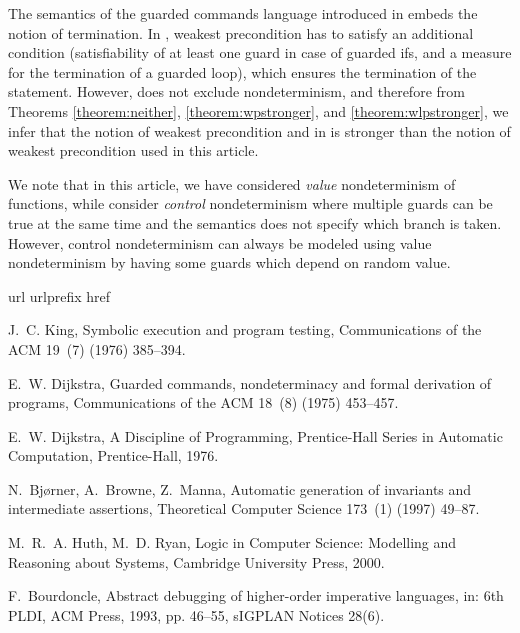 \documentclass[times]{elsarticle}
\begin{document}
The semantics of the guarded commands language introduced in
\cite{dijkstra75gcl} embeds the notion of termination. In
\cite{dijkstra75gcl}, weakest precondition has to satisfy an
additional condition  (satisfiability of at least one guard in case
of guarded ifs, and a measure for the termination of a guarded loop),
which ensures the termination of the statement. However,  does not
exclude nondeterminism, and therefore from Theorems
\ref{theorem:neither}, \ref{theorem:wpstronger}, and
\ref{theorem:wlpstronger}, we infer that the notion of weakest
precondition and  in \cite{dijkstra76lang} is stronger than the
notion of weakest precondition used in this article.

We note that in this article, we have considered \emph{value\/}
nondeterminism of functions, while \cite{dijkstra75gcl} consider
\emph{control\/} nondeterminism where multiple guards can be true at
the same time and the semantics does not specify which branch is
taken. However, control nondeterminism can always be modeled using
value nondeterminism by having some guards which depend on random
value.

\begin{thebibliography}{1}
\expandafter\ifx\csname url\endcsname\relax
  \def\url#1{\texttt{#1}}\fi
\expandafter\ifx\csname urlprefix\endcsname\relax\def\urlprefix{URL }\fi
\expandafter\ifx\csname href\endcsname\relax
  \def\href#1#2{#2} \def\path#1{#1}\fi

J.~C. King, Symbolic execution and program testing, Communications of the ACM
  19~(7) (1976) 385--394.

E.~W. Dijkstra, Guarded commands, nondeterminacy and formal derivation of
  programs, Communications of the ACM 18~(8) (1975) 453--457.

E.~W. Dijkstra, A Discipline of Programming, Prentice-Hall Series in Automatic
  Computation, Prentice-Hall, 1976.

N.~Bj{\o}rner, A.~Browne, Z.~Manna, Automatic generation of invariants and
  intermediate assertions, Theoretical Computer Science 173~(1) (1997) 49--87.

M.~R.~A. Huth, M.~D. Ryan, Logic in Computer Science: Modelling and Reasoning
  about Systems, Cambridge University Press, 2000.

F.~Bourdoncle, Abstract debugging of higher-order imperative languages, in: 6th
  PLDI, ACM Press, 1993, pp. 46--55, sIGPLAN Notices 28(6).

\end{thebibliography}
\end{document}
